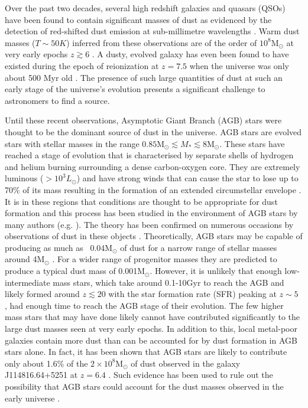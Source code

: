 Over the past two decades, several high redshift galaxies and quasars (QSOs) have been found to contain significant masses of dust as evidenced by the detection of red-shifted dust emission at sub-millimetre wavelengths \citep{Carilli2001, Omont2001, Bertoldi2002, Bertoldi2003, Watson2015}.  Warm dust masses ($T\sim50K$) inferred from these observations are of the order of $10^8$M$_{\odot}$ at very early epochs $z \gtrsim 6$ \citep{Robson2004,Beelen2006,Dwek2007}.  A dusty, evolved galaxy has even been found to have existed during the epoch of reionization at $z=7.5$ when the universe was only about 500 Myr old \citep{Watson2015}.  The presence of such large quantities of dust at such an early stage of the universe's evolution presents a significant challenge to astronomers to find a source.  

Until these recent observations, Asymptotic Giant Branch (AGB) stars were thought to be the dominant source of dust in the universe.  AGB stars are evolved stars with stellar masses in the range $0.85$M$_{\odot} \lesssim M_{*} \lesssim 8$M$_{\odot}$.  These stars have reached a stage of evolution that is characterised by separate shells of hydrogen and helium burning surrounding a dense carbon-oxygen core. They are extremely luminous ($>10^3L_{\odot}$) and have strong winds that can cause the star to lose up to 70\% of its mass resulting in the formation of an extended circumstellar envelope \citep{Wood2004a}.  It is in these regions that conditions are thought to be appropriate for dust formation and this process has been studied in the environment of AGB stars by many authors (e.g. \citet{Gail1999,Cherchneff2000,Ferrarotti2005}).  The theory has been confirmed on numerous occasions by observations of dust  in these objects \citep{Meixner2006,Matsuura2009,Sloan2009,Boyer2011,Boyer2012,Riebel2012,Matsuura2013}. Theoretically, AGB stars may be capable of producing as much as ~0.04M$_{\odot}$ of dust for a narrow range of stellar masses around 4M$_{\odot}$ \citep{Ferrarotti2006}.  For a wider range of progenitor masses they are predicted to produce a typical dust mass of 0.001M$_{\odot}$. However, it is unlikely that enough low-intermediate mass stars, which take around 0.1-10Gyr to reach the AGB \citep{Salaris2014} and likely formed around $z\lesssim20$ with the star formation rate (SFR) peaking at $z\sim5$ \citep{Greif2006}, had enough time to reach the AGB stage of their evolution.  The few higher mass stars that may have done likely cannot have contributed significantly to the large dust masses seen at very early epochs.  In addition to this, local metal-poor galaxies contain more dust than can be accounted for by dust formation in AGB stars alone.  In fact, it has been shown that AGB stars are likely to contribute only about 1.6\% of the $2\times 10^8$M$_{\odot}$ of dust observed in the galaxy J114816.64+5251 at $z=6.4$ \citep{Dwek2007,Matsuura2009,Matsuura2013}.  Such evidence has been used to rule out the possibility that AGB stars could account for the dust masses observed in the early universe \citep{Michalowski2015}.

